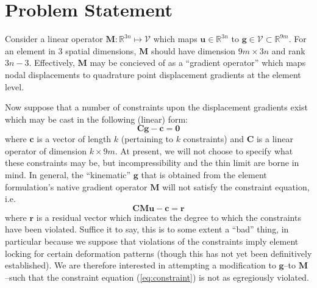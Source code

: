 \documentclass[12pt]{article}
\begin{document}
\maketitle

\section{Problem Statement}
Consider a linear operator $\mathbf{M} \colon \mathbb{R}^{3n} \mapsto \mathcal{V}$ which maps $\mathbf{u} \in \mathbb{R}^{3n}$ to $\mathbf{g} \in \mathcal{V} \subset \mathbb{R}^{9m}$. For an element in 3 spatial dimensions, $\mathbf{M}$ should have dimension $9m \times 3n$ and rank $3n - 3$. Effectively, $\mathbf{M}$ may be concieved of as a ``gradient operator'' which maps nodal displacements to quadrature point displacement gradients at the element level.

Now suppose that a number of constraints upon the displacement gradients exist which may be cast in the following (linear) form:
\begin{equation}
        \mathbf{C} \mathbf{g} - \mathbf{c} = \mathbf{0}
\end{equation}
where $\mathbf{c}$ is a vector of length $k$ (pertaining to $k$ constraints) and $\mathbf{C}$ is a linear operator of dimension $k \times 9m$. At present, we will not choose to specify what these constraints may be, but incompressibility and the thin limit are borne in mind. In general, the ``kinematic'' $\mathbf{g}$ that is obtained from the element formulation's native gradient operator $\mathbf{M}$ will not satisfy the constraint equation, i.e.
\begin{equation}
        \mathbf{C} \mathbf{M} \mathbf{u} - \mathbf{c} = \mathbf{r}
        \label{eq:constraint}
\end{equation}
where $\mathbf{r}$ is a residual vector which indicates the degree to which the constraints have been violated. Suffice it to say, this is to some extent a ``bad'' thing, in particular because we suppose that violations of the constraints imply element locking for certain deformation patterns (though this has not yet been definitively established). We are therefore interested in attempting a modification to $\mathbf{g}$--to $\mathbf{M}$--such that the constraint equation (\ref{eq:constraint}) is not as egregiously violated.
\end{document}

